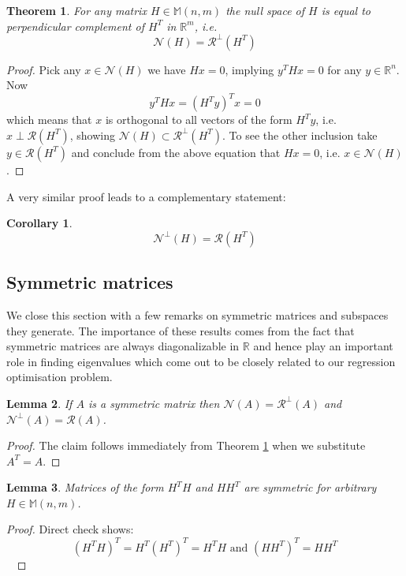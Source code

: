 \documentclass[a4paper]{article}
\theoremstyle{break}
\newtheorem{theorem}{Theorem}[section]
\newtheorem{corollary}{Corollary}[theorem]
\newtheorem{lemma}[theorem]{Lemma}
\newcommand{\R}{\mathbb{R}}
\newcommand{\Nu}{\mathcal{N}}
\newcommand{\Ra}{\mathcal{R}}
\newcommand{\Mat}[2]{\mathbb{M}(#1, #2)}
\begin{document}
\begin{theorem} \label{thm:charact_nullspace}
    For any matrix $H \in \Mat{n}{m}$ the null space of $H$ is equal to perpendicular complement of $H^T$ in $\R^m$, i.e.
    $$\Nu(H) = \Ra^\perp(H^T)$$
\end{theorem}

\begin{proof}
    Pick any $x \in \Nu(H)$ we have $H x = 0$, implying $ y^T H x = 0$ for any $y \in \R^n$. Now
    $$  y^T H x = (H^T y )^T x = 0$$
    which means that $x$ is orthogonal to all vectors of the form $ H^T y $, i.e. $ x \perp \Ra(H^T)$, showing $ \Nu(H) \subset \Ra^\perp(H^T)$. To see the other inclusion take $ y \in \Ra(H^T) $ and conclude from the above equation that $ H x = 0$, i.e. $ x \in \Nu(H)$.
\end{proof}
A very similar proof leads to a complementary statement:
\begin{corollary} \label{cor:charact_range}
    $$\Nu^\perp(H) = \Ra(H^T)$$
\end{corollary}

\subsection{Symmetric matrices}
We close this section with a few remarks on symmetric matrices and subspaces they generate. The importance of these results comes from the fact that symmetric matrices are always diagonalizable in $\R$ and hence play an important role in finding eigenvalues which come out to be closely related to our regression optimisation problem. 

\begin{lemma} \label{lem:charact_sym_nullspace}
    If $A$ is a symmetric matrix then $\Nu(A) = \Ra^\perp(A)$ and $\Nu^\perp(A) = \Ra(A)$.
\end{lemma}
\begin{proof}
    The claim follows immediately from Theorem \ref{thm:charact_nullspace} when we substitute $A^T = A$.
\end{proof}

\begin{lemma}
Matrices of the form $H^T H$ and $H H^T$ are symmetric for arbitrary $H \in \Mat{n}{m}$.
\end{lemma}
\begin{proof}
    Direct check shows:
    $$(H^T H)^T = H^T (H^T)^T = H^T H \text{ and } (H H^T)^T = H H^T$$~
\end{proof}
\end{document}
